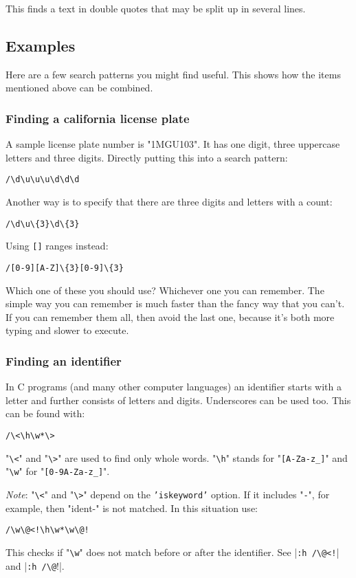 This finds a text in double quotes that may be split up in several lines.
\subsection{Examples}
Here are a few search patterns you might find useful.
This shows how the items mentioned above can be combined.

\subsubsection{Finding a california license plate}
A sample license plate number is "1MGU103".
It has one digit, three uppercase letters and three digits.
Directly putting this into a search pattern:

\begin{Verbatim}[samepage=true]
 /\d\u\u\u\d\d\d
\end{Verbatim}

Another way is to specify that there are three digits and letters with a count:

\begin{Verbatim}[samepage=true]
 /\d\u\{3}\d\{3}
\end{Verbatim}

Using \texttt{[]} ranges instead:

\begin{Verbatim}[samepage=true]
 /[0-9][A-Z]\{3}[0-9]\{3}
\end{Verbatim}

Which one of these you should use?  Whichever one you can remember.
The simple way you can remember is much faster than the fancy way that you can't.
If you can remember them all, then avoid the last one, because it's both more typing and slower to execute.

\subsubsection{Finding an identifier}
In C programs (and many other computer languages) an identifier starts with a letter and further consists of letters and digits.
Underscores can be used too.
This can be found with:

\begin{Verbatim}[samepage=true]
 /\<\h\w*\>
\end{Verbatim}

"\texttt{\textbackslash{}<}" and "\texttt{\textbackslash{}>}" are used to find only whole words.
"\texttt{\textbackslash{}h}" stands for "\texttt{[A-Za-z\_]}" and "\texttt{\textbackslash{}w}" for "\texttt{[0-9A-Za-z\_]}".

\emph{Note}:
"\texttt{\textbackslash{}<}" and "\texttt{\textbackslash{}>}" depend on the \texttt{'iskeyword'} option.
If it includes "\texttt{-}", for example, then "ident-" is not matched.
In this situation use:

\begin{Verbatim}[samepage=true]
     /\w\@<!\h\w*\w\@!
\end{Verbatim}
 
This checks if "\texttt{\textbackslash{}w}" does not match before or after the identifier.
See |\texttt{:h /\textbackslash{}@<!}| and |\texttt{:h /\textbackslash{}@}!|.
\clearpage
